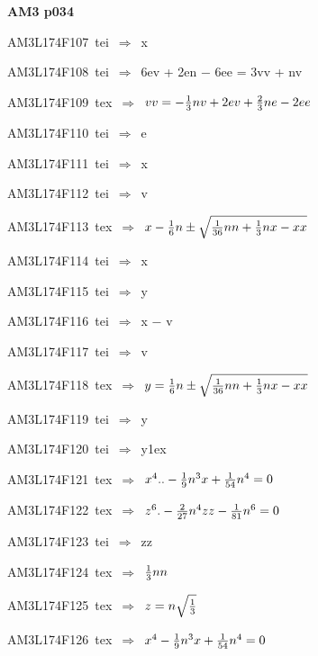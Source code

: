 \par\vfill\eject
{\bf\hfill AM3 p034\hfill\hbox{}}\par\bigskip
{\sixrm AM3L174F107\ {\sixit tei}\ }$\Rightarrow$\ {\tenit x}\par\smallskip
{\sixrm AM3L174F108\ {\sixit tei}\ }$\Rightarrow$\ 6{\tenit ev} + 2{\tenit en} − 6{\tenit ee} = 3{\tenit vv} + {\tenit nv}\par\smallskip
{\sixrm AM3L174F109\ {\sixit tex}\ }$\Rightarrow$\ $vv = - {{1\over 3}}nv + 2ev + {{2\over 3}}ne - 2ee$\par\smallskip
{\sixrm AM3L174F110\ {\sixit tei}\ }$\Rightarrow$\ {\tenit e}\par\smallskip
{\sixrm AM3L174F111\ {\sixit tei}\ }$\Rightarrow$\ {\tenit x}\par\smallskip
{\sixrm AM3L174F112\ {\sixit tei}\ }$\Rightarrow$\ {\tenit v}\par\smallskip
{\sixrm AM3L174F113\ {\sixit tex}\ }$\Rightarrow$\ $x - {{1\over 6}}n \pm  \sqrt{{{1\over 36}}nn + {{1\over 3}}nx - xx}$\par\smallskip
{\sixrm AM3L174F114\ {\sixit tei}\ }$\Rightarrow$\ {\tenit x}\par\smallskip
{\sixrm AM3L174F115\ {\sixit tei}\ }$\Rightarrow$\ {\tenit y}\par\smallskip
{\sixrm AM3L174F116\ {\sixit tei}\ }$\Rightarrow$\ {\tenit x} − {\tenit v}\par\smallskip
{\sixrm AM3L174F117\ {\sixit tei}\ }$\Rightarrow$\ {\tenit v}\par\smallskip
{\sixrm AM3L174F118\ {\sixit tex}\ }$\Rightarrow$\ $y = {{1\over 6}}n \pm  \sqrt{{{1\over 36}}nn + {{1\over 3}}nx - xx}$\par\smallskip
{\sixrm AM3L174F119\ {\sixit tei}\ }$\Rightarrow$\ {\tenit y}\par\smallskip
{\sixrm AM3L174F120\ {\sixit tei}\ }$\Rightarrow$\ {\tenit y}\raise1ex\hbox{}\par\smallskip
{\sixrm AM3L174F121\ {\sixit tex}\ }$\Rightarrow$\ $x^{4}.. - {{1\over 9}}n^{3}x + {{1\over 54}}n^{4} = 0$\par\smallskip
{\sixrm AM3L174F122\ {\sixit tex}\ }$\Rightarrow$\ $z^{6}. - {{2\over 27}}n^{4}zz - {{1\over 81}}n^{6} = 0$\par\smallskip
{\sixrm AM3L174F123\ {\sixit tei}\ }$\Rightarrow$\ {\tenit zz}\par\smallskip
{\sixrm AM3L174F124\ {\sixit tex}\ }$\Rightarrow$\ ${{1\over 3}}nn$\par\smallskip
{\sixrm AM3L174F125\ {\sixit tex}\ }$\Rightarrow$\ $z = n\sqrt{{{1\over 3}}}$\par\smallskip
{\sixrm AM3L174F126\ {\sixit tex}\ }$\Rightarrow$\ $x^{4} - {{1\over 9}}n^{3}x + {{1\over 54}}n^{4} = 0$\par\smallskip

